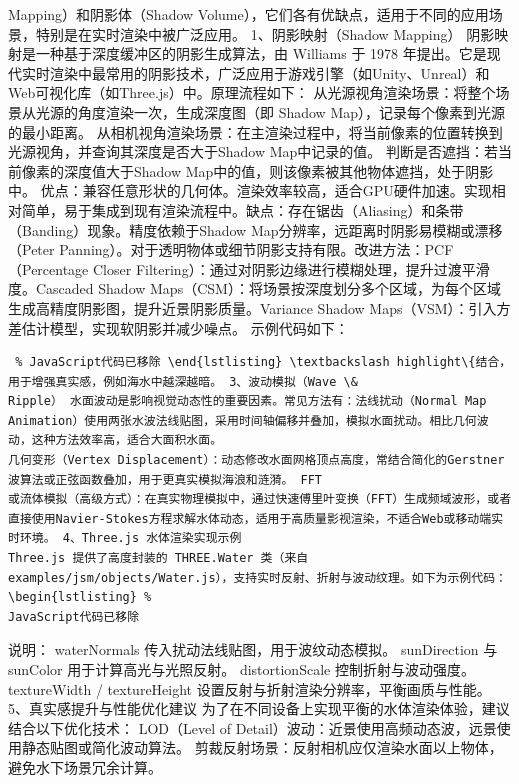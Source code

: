 {Mapping）和阴影体（Shadow Volume），它们各有优缺点，适用于不同的应用场景，特别是在实时渲染中被广泛应用。 1、阴影映射（Shadow Mapping） 阴影映射是一种基于深度缓冲区的阴影生成算法，由 Williams 于
1978 年提出。它是现代实时渲染中最常用的阴影技术，广泛应用于游戏引擎（如Unity、Unreal）和Web可视化库（如Three.js）中。原理流程如下： 从光源视角渲染场景：将整个场景从光源的角度渲染一次，生成深度图（即 Shadow
Map），记录每个像素到光源的最小距离。 从相机视角渲染场景：在主渲染过程中，将当前像素的位置转换到光源视角，并查询其深度是否大于Shadow Map中记录的值。 判断是否遮挡：若当前像素的深度值大于Shadow
Map中的值，则该像素被其他物体遮挡，处于阴影中。 优点：兼容任意形状的几何体。渲染效率较高，适合GPU硬件加速。实现相对简单，易于集成到现有渲染流程中。缺点：存在锯齿（Aliasing）和条带（Banding）现象。精度依赖于Shadow
Map分辨率，远距离时阴影易模糊或漂移（Peter Panning）。对于透明物体或细节阴影支持有限。改进方法：PCF（Percentage Closer Filtering）：通过对阴影边缘进行模糊处理，提升过渡平滑度。Cascaded
Shadow Maps（CSM）：将场景按深度划分多个区域，为每个区域生成高精度阴影图，提升近景阴影质量。Variance Shadow Maps（VSM）：引入方差估计模型，实现软阴影并减少噪点。 示例代码如下：
\begin{lstlisting} % JavaScript代码已移除 \end{lstlisting} \textbackslash highlight\{结合，用于增强真实感，例如海水中越深越暗。 3、波动模拟（Wave \&
Ripple） 水面波动是影响视觉动态性的重要因素。常见方法有：法线扰动（Normal Map Animation）使用两张水波法线贴图，采用时间轴偏移并叠加，模拟水面扰动。相比几何波动，这种方法效率高，适合大面积水面。
几何变形（Vertex Displacement）：动态修改水面网格顶点高度，常结合简化的Gerstner 波算法或正弦函数叠加，用于更真实模拟海浪和涟漪。 FFT
或流体模拟（高级方式）：在真实物理模拟中，通过快速傅里叶变换（FFT）生成频域波形，或者直接使用Navier-Stokes方程求解水体动态，适用于高质量影视渲染，不适合Web或移动端实时环境。 4、Three.js 水体渲染实现示例
Three.js 提供了高度封装的 THREE.Water 类（来自 examples/jsm/objects/Water.js），支持实时反射、折射与波动纹理。如下为示例代码： \begin{lstlisting} %
JavaScript代码已移除 \end{lstlisting} 说明： waterNormals 传入扰动法线贴图，用于波纹动态模拟。 sunDirection 与 sunColor 用于计算高光与光照反射。
distortionScale 控制折射与波动强度。 textureWidth / textureHeight 设置反射与折射渲染分辨率，平衡画质与性能。 5、真实感提升与性能优化建议
为了在不同设备上实现平衡的水体渲染体验，建议结合以下优化技术： LOD（Level of Detail）波动：近景使用高频动态波，远景使用静态贴图或简化波动算法。 剪裁反射场景：反射相机应仅渲染水面以上物体，避免水下场景冗余计算。
}

